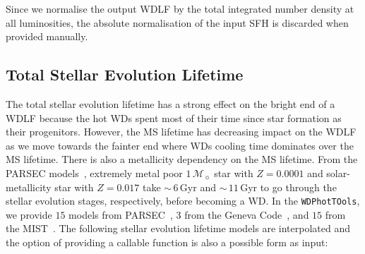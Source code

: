 \documentclass[fleqn,usenatbib]{rasti}
\newcommand{\msun}{\mathcal{M}_{\sun}}
\begin{document}
Since we normalise the output WDLF by the total integrated number density at
all luminosities, the absolute normalisation of the input SFH is discarded when
provided manually.

\subsection{Total Stellar Evolution Lifetime}
The total stellar evolution lifetime has a strong effect on the bright end of a
WDLF because the hot WDs spent most of their time since star formation as their
progenitors. However, the MS lifetime has decreasing impact on the WDLF as we
move towards the fainter end where WDs cooling time dominates over the MS
lifetime. There is also a metallicity dependency on the MS lifetime. From the
PARSEC models~\citep{2013EPJWC..4303001B}, extremely metal poor $1\,\msun$ star
with  $Z=0.0001$ and solar-metallicity star with $Z=0.017$ take $\sim$\,$6$\,Gyr
and $\sim$\,$11$\,Gyr to go through the stellar evolution stages, respectively,
before becoming a WD. In the \texttt{WDPhotTOols}, we provide $15$ models from
PARSEC~\citep{2012MNRAS.427..127B, 2013EPJWC..4303001B, 2014MNRAS.444.2525C},
$3$ from the Geneva Code~\citep{2012A&A...537A.146E, 2012A&A...541A..41M,
2013A&A...553A..24G, 2013A&A...558A.103G}, and $15$ from the
MIST~\citep{2011ApJS..192....3P, 2013ApJS..208....4P, 2015ApJS..220...15P,
2016ApJS..222....8D, 2016ApJ...823..102C}. The following stellar evolution
lifetime models are interpolated and the option of providing a callable
function is also a possible form as input:
\end{document}
